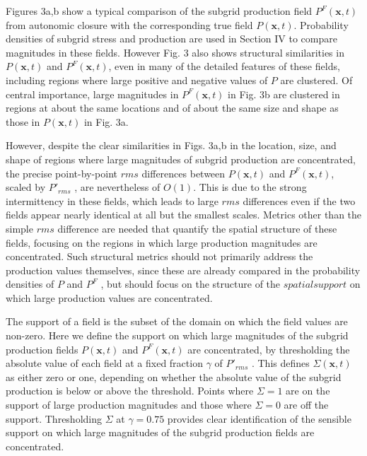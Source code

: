 Figures 3a,b show a typical comparison of the subgrid production field $P^{F}(\mathbf{x},t)$ from autonomic closure with the corresponding true field $P(\mathbf{x},t)$. Probability densities of subgrid stress and production are used in Section IV to compare magnitudes in these fields. However Fig. 3 also shows structural similarities in  $P(\mathbf{x},t)$ and $P^{F}(\mathbf{x},t)$, even in many of the detailed features of these fields, including regions where large positive and negative values of $P$ are clustered. Of central importance, large magnitudes in $P^{F}(\mathbf{x},t)$  in Fig. 3b are clustered in regions at about the same locations and of about the same size and shape as those in $P(\mathbf{x},t)$ in Fig. 3a. 

However, despite the clear similarities in Figs. 3a,b in the location, size, and shape of regions where large magnitudes of subgrid production are concentrated, the precise point-by-point $rms$ differences between  $P(\mathbf{x},t)$ and $P^F(\mathbf{x},t)$, scaled by $P'_{rms}$ , are nevertheless of $O(1)$. This is due to the strong intermittency in these fields, which leads to large $rms$ differences even if the two fields appear nearly identical at all but the smallest scales. Metrics other than the simple $rms$ difference are needed that quantify the spatial structure of these fields, focusing on the regions in which large production magnitudes are concentrated. Such structural metrics should not primarily address the production values themselves, since these are already compared in the probability densities of $P$ and $P^F$  , but should focus on the structure of the $spatial support$ on which large production values are concentrated.  

The support of a field is the subset of the domain on which the field values are non-zero. Here we define the support on which large magnitudes of the subgrid production fields  $P(\mathbf{x},t)$ and $P^F(\mathbf{x},t)$ are concentrated, by thresholding the absolute value of each field at a fixed fraction  $\gamma$ of $P'_{rms}$ . This defines $\Sigma(\mathbf{x},t)$  as either zero or one, depending on whether the absolute value of the subgrid production is below or above the threshold. Points where  $\Sigma = 1$ are on the support of large production magnitudes and those where  $\Sigma = 0$  are off the support. Thresholding $\Sigma$  at $\gamma = 0.75$   provides clear identification of the sensible support on which large magnitudes of the subgrid production fields are concentrated. 

